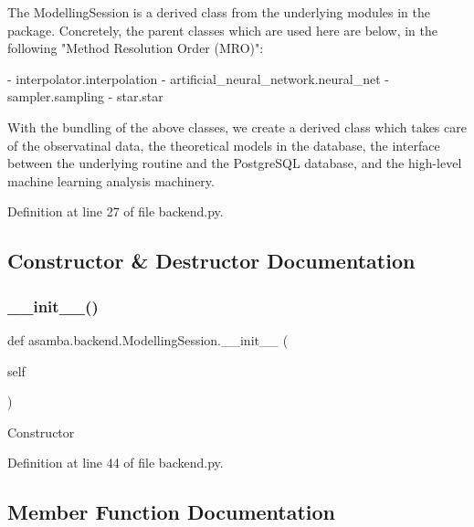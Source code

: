 \begin{DoxyVerb}The ModellingSession is a derived class from the underlying modules in the package. 
Concretely, the parent classes which are used here are below, in the following "Method
Resolution Order (MRO)":

  - interpolator.interpolation
  - artificial_neural_network.neural_net
  - sampler.sampling
  - star.star

With the bundling of the above classes, we create a derived class which takes care of 
the observatinal data, the theoretical models in the database, the interface between 
the underlying routine and the PostgreSQL database, and the high-level machine learning
analysis machinery.
\end{DoxyVerb}
 

Definition at line 27 of file backend.\+py.



\subsection{Constructor \& Destructor Documentation}
\mbox{\label{classasamba_1_1backend_1_1_modelling_session_a4d7e25887ba7c8af5ae303b2dc63191d}} 
\subsubsection{\texorpdfstring{\+\_\+\+\_\+init\+\_\+\+\_\+()}{\_\_init\_\_()}}
{\footnotesize\ttfamily def asamba.\+backend.\+Modelling\+Session.\+\_\+\+\_\+init\+\_\+\+\_\+ (\begin{DoxyParamCaption}\item[{}]{self }\end{DoxyParamCaption})}

\begin{DoxyVerb}Constructor \end{DoxyVerb}
 

Definition at line 44 of file backend.\+py.



\subsection{Member Function Documentation}
\mbox{\label{classasamba_1_1backend_1_1_modelling_session_a32588cc6e0b3869d3d5ef688953599d2}} 

